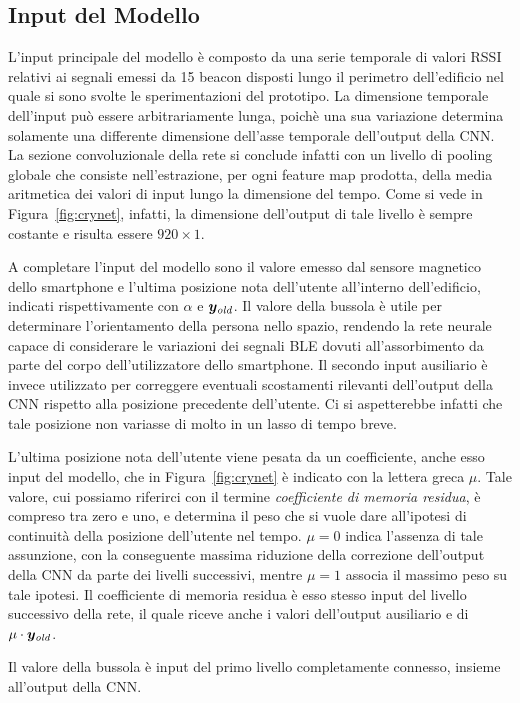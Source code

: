 \subsection{Input del Modello}
L'input principale del modello è composto da una serie temporale di valori RSSI
relativi ai segnali emessi da 15 beacon disposti lungo il perimetro
dell'edificio nel quale si sono svolte le sperimentazioni del prototipo. La
dimensione temporale dell'input può essere arbitrariamente lunga, poichè una
sua variazione determina solamente una differente dimensione dell'asse
temporale dell'output della CNN\@. La sezione convoluzionale della rete si
conclude infatti con un livello di pooling globale che consiste
nell'estrazione, per ogni feature map prodotta, della media aritmetica dei
valori di input lungo la dimensione del tempo. Come si vede in
Figura~\ref{fig:crynet}, infatti, la dimensione dell'output di tale livello è
sempre costante e risulta essere $920\times1$.

A completare l'input del modello sono il valore emesso dal sensore magnetico
dello smartphone e l'ultima posizione nota dell'utente all'interno
dell'edificio, indicati rispettivamente con \(\alpha\) e \( \bm y_{\mathit{old}} \). Il
valore della bussola è utile per determinare l'orientamento della persona nello
spazio, rendendo la rete neurale capace di considerare le variazioni dei
segnali BLE dovuti all'assorbimento da parte del corpo dell'utilizzatore dello
smartphone. Il secondo input ausiliario è invece utilizzato per correggere
eventuali scostamenti rilevanti dell'output della CNN rispetto alla posizione
precedente dell'utente. Ci si aspetterebbe infatti che tale posizione non
variasse di molto in un lasso di tempo breve.

L'ultima posizione nota dell'utente viene pesata da un coefficiente, anche esso
input del modello, che in Figura~\ref{fig:crynet} è indicato con la lettera
greca \(\mu\). Tale valore, cui possiamo riferirci con il termine
\emph{coefficiente di memoria residua}, è compreso tra zero e uno, e determina
il peso che si vuole dare all'ipotesi di continuità della posizione dell'utente
nel tempo.  \(\mu = 0\) indica l'assenza di tale assunzione, con la conseguente
massima riduzione della correzione dell'output della CNN da parte dei livelli
successivi, mentre \(\mu = 1 \) associa il massimo peso su tale ipotesi. Il
coefficiente di memoria residua è esso stesso input del livello successivo
della rete, il quale riceve anche i valori dell'output ausiliario e di 
\(\mu \cdot \bm y_{\mathit{old}}\).

Il valore della bussola è input del primo livello completamente connesso,
insieme all'output della CNN\@.
